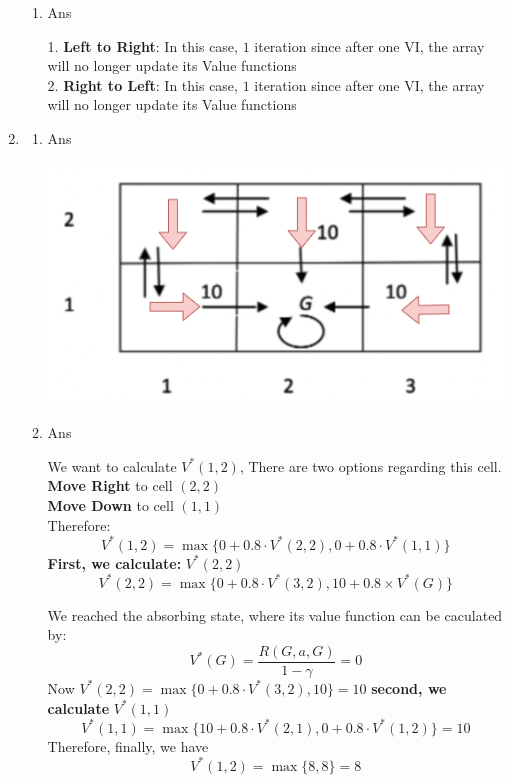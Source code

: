 \documentclass[12pt]{article}
\begin{document}
\begin{enumerate}
\begin{enumerate}
    \item Ans
    \begin{tcolorbox}
        1. \textbf{Left to Right}: In this case, \(1\) iteration since after one VI, the array will no longer update its Value functions\\
        2. \textbf{Right to Left}: In this case, \(1\) iteration since after one VI, the array will no longer update its Value functions
    \end{tcolorbox}
\end{enumerate}
\item
\begin{enumerate}
    \item Ans
    \begin{tcolorbox}
        \begin{center}
        \includegraphics[scale = 0.5]{images/p4a.png}
        \end{center}
    \end{tcolorbox}
    \item Ans
    \begin{tcolorbox}
        We want to calculate \(V^{*}(1,2)\), There are two options regarding this cell.\\
        \textbf{Move Right} to cell \((2,2)\)\\
        \textbf{Move Down} to cell \((1,1)\)\\
        Therefore:
        \[
        V^{*}(1, 2) = \max \{0 + 0.8 \cdot V^{*}(2,2), 0 + 0.8 \cdot V^{*}(1,1)\}
        \]
        \textbf{First, we calculate:}  \(V^{*}(2,2)\)
        \[
        V^{*}(2, 2) = \max \{0 + 0.8 \cdot V^{*}(3,2), 10 + 0.8 \times V^{*}(G)\}
        \]
        
        We reached the absorbing state, where its value function can be caculated by:
        \[
        V^{*}(G) = \frac{R(G, a, G)}{1 - \gamma}  = 0
        \]
        Now \(V^{*}(2,2) = \max\{ 0 + 0.8 \cdot V^{*}(3,2), 10\} = 10\)
        \textbf{second, we calculate} \(V^{*}(1,1)\)
        \[
        V^{*}(1,1) = \max\{10 + 0.8 \cdot V^{*}(2,1), 0 + 0.8 \cdot V^{*}(1,2)\} = 10
        \]
        Therefore, finally, we have
        \[
        V^*(1,2) = \max\{8, 8\} = 8
        \]
        

\end{tcolorbox}
\end{enumerate}
\end{enumerate}
\end{document}

